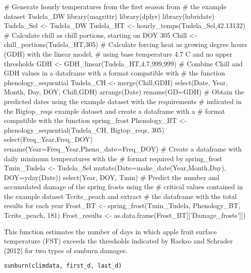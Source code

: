 \documentclass[a4paper]{book}
\begin{document}
%
\begin{Examples}
\begin{ExampleCode}
# Generate hourly temperatures from the first season from
# the example dataset Tudela_DW
library(magrittr)
library(dplyr)
library(lubridate)
Tudela_Sel <- Tudela_DW %
Tudela_HT <- hourly_temps(Tudela_Sel,42.13132)
# Calculate chill as chill portions, starting on DOY 305
Chill <- chill_portions(Tudela_HT,305)
# Calculate forcing heat as growing degree hours (GDH) with the linear model,
# using base temperature 4.7 C and no upper thresholds
GDH <- GDH_linear(Tudela_HT,4.7,999,999)
# Combine Chill and GDH values in a dataframe with a format compatible with
# the function phenology_sequential
Tudela_CH <- merge(Chill,GDH) %
   select(Date, Year, Month, Day, DOY, Chill,GDH) %
   arrange(Date) %
   rename(GD=GDH)
# Obtain the predicted dates using the example dataset with the requirements 
# indicated in the Bigtop_reqs example dataset and create a dataframe with a
# format compatible with the function spring_frost
Phenology_BT <- phenology_sequential(Tudela_CH, Bigtop_reqs, 305) %
   select(Freq_Year,Freq_DOY) %
   rename(Year=Freq_Year,Pheno_date=Freq_DOY)
# Create a dataframe with daily minimum temperatures with the 
# format required by spring_frost
Tmin_Tudela <- Tudela_Sel %
  mutate(Date=make_date(Year,Month,Day), DOY=yday(Date)) %
  select(Year, DOY, Tmin) 
# Predict the number and accumulated damage of the spring frosts using the
# critical values contained in the example dataset Tcrits_peach and extract
# the dataframe with the total results for each year
Frost_BT <- spring_frost(Tmin_Tudela, Phenology_BT, Tcrits_peach, 181)
Frost_results <- as.data.frame(Frost_BT[['Damage_frosts']]) 

\end{ExampleCode}
\end{Examples}
%
\begin{Description}\relax
This function estimates the number of days in which apple fruit
surface temperature (FST) exceeds the thresholds indicated by
Rackso and Schrader (2012) for two types of sunburn damages.
\end{Description}
%
\begin{Usage}
\begin{verbatim}
sunburn(climdata, first_d, last_d)
\end{verbatim}
\end{Usage}
\end{document}
